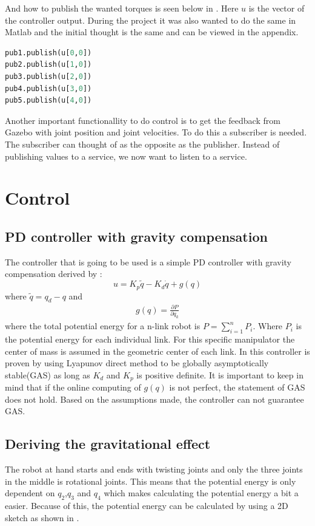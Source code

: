 And how to publish the wanted torques is seen below in . Here $u$ is the vector of the controller output. During the project it was also wanted to do the same in Matlab and the initial thought is the same and can be viewed in the appendix. 

\begin{lstlisting}[language=python,caption={Python code for publish wanted torques},label={lst:pythonPubs}]
pub1.publish(u[0,0])
pub2.publish(u[1,0])
pub3.publish(u[2,0])
pub4.publish(u[3,0])
pub5.publish(u[4,0])
\end{lstlisting}

Another important functionallity to do control is to get the feedback from Gazebo with joint position and joint velocities. To do this a subscriber is needed. The subscriber can thought of as the opposite as the publisher. Instead of publishing values to a service, we now want to listen to a service. 


\section{Control}

\subsection{PD controller with gravity compensation}

The controller that is going to be used is a simple PD controller with gravity compensation derived by \cite{spong}:
$$
    u=K_p\tilde{q} - K_d\dot{q} +g(q)
$$
 where $\tilde{q} = q_d - q$ and 
 \begin{align}\label{eq:gravity}
 g(q) = \frac{\partial P}{\partial q_k}
 \end{align}
 where the total potential energy for a n-link robot is $P = \sum^n_{i=1}P_i$. Where $P_i$ is the potential energy for each individual link. For this specific manipulator the center of mass is assumed in the geometric center of each link. In \cite{Siciliano} this controller is proven by using Lyapunov direct method to be globally asymptotically stable(GAS) as long as $K_d$ and $K_p$ is positive definite. It is important to keep in mind that if the online computing of $g(q)$ is not perfect, the statement of GAS does not hold. Based on the assumptions made, the controller can not guarantee GAS. 
 
 \subsection{Deriving the gravitational effect}
 The robot at hand starts and ends with twisting joints and only the three joints in the middle is rotational joints. This means that the potential energy is only dependent on $q_2$,$q_3$ and $q_4$ which makes calculating the potential energy a bit a easier. Because of this, the potential energy can be calculated by using a 2D sketch as shown in .

